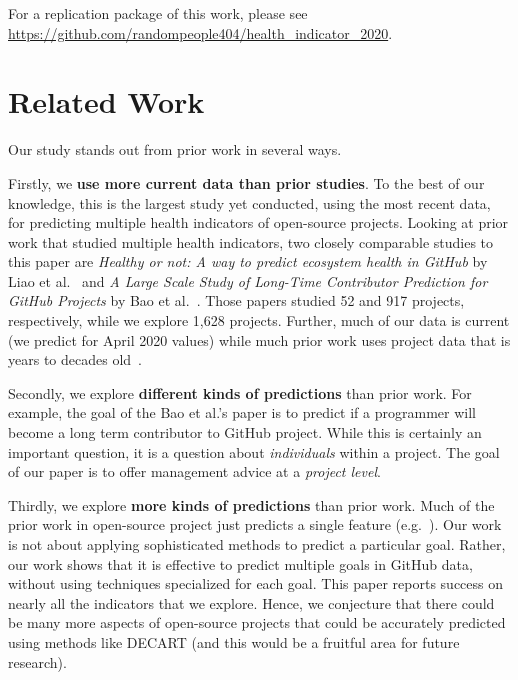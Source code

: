 \documentclass[sigconf,review,anonymous]{acmart}
\begin{document}
 

For a replication package of this work, please see   \url{https://github.com/randompeople404/health_indicator_2020}.
\vspace{-3mm}


\section{Related Work}
\label{sect:related}

 
Our study stands out from prior work in several ways.

Firstly, we {\bf use more current data than prior studies}.
To the best of our knowledge, this is the largest study yet conducted, using the most recent data,  for predicting multiple health indicators of open-source projects.
Looking at prior work that studied multiple health indicators,
two closely  comparable studies to this paper are {\em Healthy or not: A way to predict ecosystem health in GitHub} by 
Liao et al.~\cite{liao2019healthy}
and{ \em A Large Scale Study of Long-Time Contributor Prediction for GitHub Projects} by
Bao et al.~\cite{bao2019large}.
Those papers studied 52 and 917 projects, respectively, while we explore 1,628 projects. Further, much of our data is current (we predict for April 2020 values) while much prior work uses project data that is years to decades old~\cite{sarro2016multi}.

Secondly, we explore {\bf different kinds of predictions} than prior work. For example, the goal of the
Bao et al.'s paper is to predict if 
a programmer will become a long term  contributor to GitHub project.
While this is certainly   an important question, it is a question about {\em individuals} within a project. The goal of our paper is to offer management advice at a  {\em project level}.

Thirdly, we explore {\bf more kinds of predictions}
than prior work.
Much of the  prior work in open-source project just predicts a single feature (e.g.~\cite{borges2016predicting,kikas2016using,chen2014predicting,weber2014makes,bao2019large}).   
Our work is not about applying sophisticated methods to predict a particular goal. Rather, our work shows that it is effective to predict multiple goals in GitHub data, without using techniques specialized for  each goal.
This paper reports success on nearly all the indicators that we explore.  Hence, 
we conjecture that there could be many more aspects of open-source projects that could
be accurately predicted using methods like DECART (and this would be a fruitful area for future research).
\end{document}
